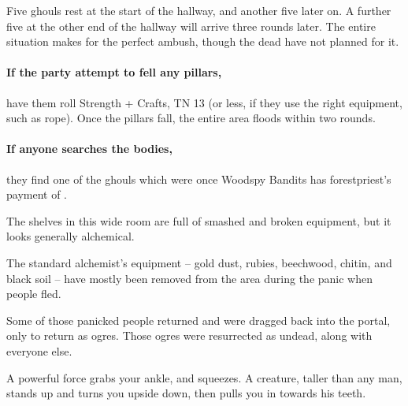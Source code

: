 \begin{multicols}{2}
Five ghouls rest at the start of the hallway, and another five later on.
A further five at the other end of the hallway will arrive three rounds later.
The entire situation makes for the perfect ambush, though the dead have not planned for it.


\paragraph{If the party attempt to fell any pillars,}
have them roll Strength + Crafts, TN 13 (or less, if they use the right equipment, such as rope).
Once the pillars fall, the entire area floods within two rounds.

\paragraph{If anyone searches the bodies,}
they find one of the ghouls which were once Woodspy Bandits has \gls{forestpriest}'s payment of \lootMedium.



\begin{boxtext}

  The shelves in this wide room are full of smashed and broken equipment, but it looks generally alchemical.

\end{boxtext}

\begin{exampletext}

The standard alchemist's equipment -- gold dust, rubies, beechwood, chitin, and black soil -- have mostly been removed from the area during the panic when people fled.

Some of those panicked people returned and were dragged back into the portal, only to return as ogres.  Those ogres were resurrected as undead, along with everyone else.

\end{exampletext}

\begin{boxtext}

  A powerful force grabs your ankle, and squeezes.
  A creature, taller than any man, stands up and turns you upside down, then pulls you in towards his teeth.

\end{boxtext}


\end{multicols}
